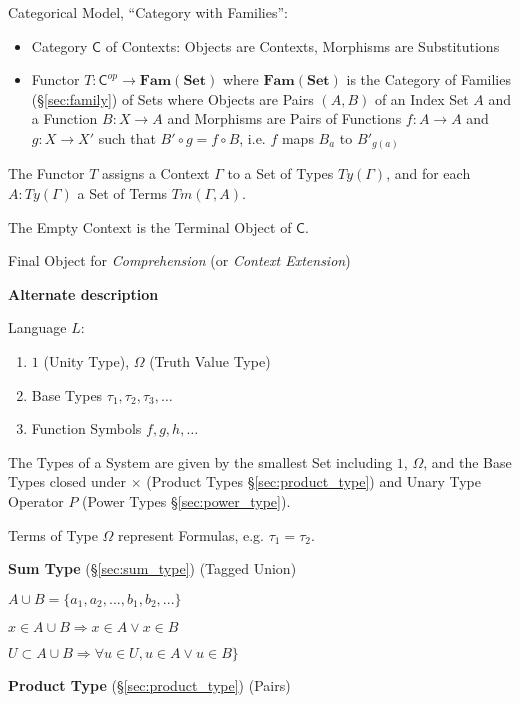 Categorical Model, ``Category with Families'':

\begin{itemize}
  \item Category $\mathsf{C}$ of Contexts: Objects are Contexts,
    Morphisms are Substitutions
  \item Functor $T : \mathsf{C}^{op} \rightarrow \mathbf{Fam(Set)}$
    where $\mathbf{Fam(Set)}$ is the Category of Families
    (\S\ref{sec:family}) of Sets where Objects are Pairs $(A,B)$ of an
    Index Set $A$ and a Function $B: X \rightarrow A$ and Morphisms
    are Pairs of Functions $f: A \rightarrow A$ and $g: X \rightarrow
    X'$ such that $B' \circ g = f \circ B$, i.e. $f$ maps $B_a$ to
    $B'_{g(a)}$
\end{itemize}

The Functor $T$ assigns a Context $\Gamma$ to a Set of Types
$Ty(\Gamma)$, and for each $A : Ty(\Gamma)$ a Set of Terms
$Tm(\Gamma,A)$.

The Empty Context is the Terminal Object of $\mathsf{C}$.

Final Object for \emph{Comprehension} (or \emph{Context Extension}) %



\textbf{Alternate description}\cite{bastenhof09}

Language $L$:
\begin{enumerate}
  \item $1$ (Unity Type), $\Omega$ (Truth Value Type)
  \item Base Types $\tau_1, \tau_2, \tau_3, \ldots$
  \item Function Symbols $f, g, h, \ldots$
\end{enumerate}
The Types of a System are given by the smallest Set including $1$,
$\Omega$, and the Base Types closed under $\times$ (Product Types
\S\ref{sec:product_type}) and Unary Type Operator $P$ (Power Types
\S\ref{sec:power_type}).

Terms of Type $\Omega$ represent Formulas, e.g. $\tau_1 = \tau_2$.


\asterism


\textbf{Sum Type} (\S\ref{sec:sum_type}) (Tagged Union)

$A \cup B = \{ a_1, a_2, ..., b_1, b_2, ... \}$

$x \in A \cup B \Rightarrow x \in A \vee x \in B$

$U \subset A \cup B \Rightarrow \forall u \in U, u \in A \vee u \in B \}$


\textbf{Product Type} (\S\ref{sec:product_type}) (Pairs)


